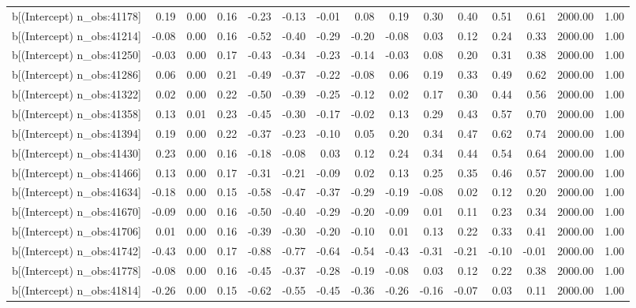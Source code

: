 \begin{table}[ht]
\begin{tabular}{rrrrrrrrrrrrrrr}
  b[(Intercept) n\_obs:41178] & 0.19 & 0.00 & 0.16 & -0.23 & -0.13 & -0.01 & 0.08 & 0.19 & 0.30 & 0.40 & 0.51 & 0.61 & 2000.00 & 1.00 \\ 
  b[(Intercept) n\_obs:41214] & -0.08 & 0.00 & 0.16 & -0.52 & -0.40 & -0.29 & -0.20 & -0.08 & 0.03 & 0.12 & 0.24 & 0.33 & 2000.00 & 1.00 \\ 
  b[(Intercept) n\_obs:41250] & -0.03 & 0.00 & 0.17 & -0.43 & -0.34 & -0.23 & -0.14 & -0.03 & 0.08 & 0.20 & 0.31 & 0.38 & 2000.00 & 1.00 \\ 
  b[(Intercept) n\_obs:41286] & 0.06 & 0.00 & 0.21 & -0.49 & -0.37 & -0.22 & -0.08 & 0.06 & 0.19 & 0.33 & 0.49 & 0.62 & 2000.00 & 1.00 \\ 
  b[(Intercept) n\_obs:41322] & 0.02 & 0.00 & 0.22 & -0.50 & -0.39 & -0.25 & -0.12 & 0.02 & 0.17 & 0.30 & 0.44 & 0.56 & 2000.00 & 1.00 \\ 
  b[(Intercept) n\_obs:41358] & 0.13 & 0.01 & 0.23 & -0.45 & -0.30 & -0.17 & -0.02 & 0.13 & 0.29 & 0.43 & 0.57 & 0.70 & 2000.00 & 1.00 \\ 
  b[(Intercept) n\_obs:41394] & 0.19 & 0.00 & 0.22 & -0.37 & -0.23 & -0.10 & 0.05 & 0.20 & 0.34 & 0.47 & 0.62 & 0.74 & 2000.00 & 1.00 \\ 
  b[(Intercept) n\_obs:41430] & 0.23 & 0.00 & 0.16 & -0.18 & -0.08 & 0.03 & 0.12 & 0.24 & 0.34 & 0.44 & 0.54 & 0.64 & 2000.00 & 1.00 \\ 
  b[(Intercept) n\_obs:41466] & 0.13 & 0.00 & 0.17 & -0.31 & -0.21 & -0.09 & 0.02 & 0.13 & 0.25 & 0.35 & 0.46 & 0.57 & 2000.00 & 1.00 \\ 
  b[(Intercept) n\_obs:41634] & -0.18 & 0.00 & 0.15 & -0.58 & -0.47 & -0.37 & -0.29 & -0.19 & -0.08 & 0.02 & 0.12 & 0.20 & 2000.00 & 1.00 \\ 
  b[(Intercept) n\_obs:41670] & -0.09 & 0.00 & 0.16 & -0.50 & -0.40 & -0.29 & -0.20 & -0.09 & 0.01 & 0.11 & 0.23 & 0.34 & 2000.00 & 1.00 \\ 
  b[(Intercept) n\_obs:41706] & 0.01 & 0.00 & 0.16 & -0.39 & -0.30 & -0.20 & -0.10 & 0.01 & 0.13 & 0.22 & 0.33 & 0.41 & 2000.00 & 1.00 \\ 
  b[(Intercept) n\_obs:41742] & -0.43 & 0.00 & 0.17 & -0.88 & -0.77 & -0.64 & -0.54 & -0.43 & -0.31 & -0.21 & -0.10 & -0.01 & 2000.00 & 1.00 \\ 
  b[(Intercept) n\_obs:41778] & -0.08 & 0.00 & 0.16 & -0.45 & -0.37 & -0.28 & -0.19 & -0.08 & 0.03 & 0.12 & 0.22 & 0.38 & 2000.00 & 1.00 \\ 
  b[(Intercept) n\_obs:41814] & -0.26 & 0.00 & 0.15 & -0.62 & -0.55 & -0.45 & -0.36 & -0.26 & -0.16 & -0.07 & 0.03 & 0.11 & 2000.00 & 1.00 \\ 

\end{tabular}
\end{table}
